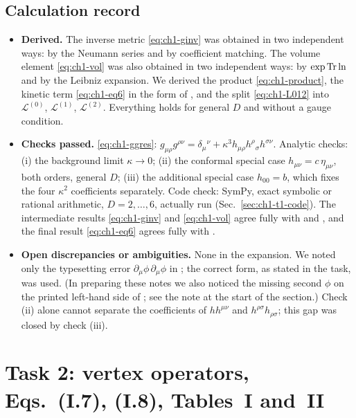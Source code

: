 \subsection{Calculation record}
\begin{itemize}[leftmargin=1.4em]
\item \textbf{Derived.} The inverse metric \eqref{eq:ch1-ginv} was obtained in
two independent ways: by the Neumann series and by coefficient matching. The
volume element \eqref{eq:ch1-vol} was also obtained in two independent ways: by
$\exp\operatorname{Tr}\ln$ and by the Leibniz expansion. We derived the product
\eqref{eq:ch1-product}, the kinetic term \eqref{eq:ch1-eq6} in the form of
, and the split \eqref{eq:ch1-L012} into $\mathcal L^{(0)}$,
$\mathcal L^{(1)}$, $\mathcal L^{(2)}$. Everything holds for general $D$ and
without a gauge condition.
\item \textbf{Checks passed.} \eqref{eq:ch1-ggres}:
$g_{\mu\rho}g^{\rho\nu}=\delta_\mu{}^\nu+\kappa^3h_{\mu\rho}h^\rho{}_\sigma h^{\sigma\nu}$.
Analytic checks: (i) the background limit $\kappa\to0$; (ii) the conformal
special case $h_{\mu\nu}=c\,\eta_{\mu\nu}$, both orders, general $D$; (iii) the
additional special case $h_{00}=b$, which fixes the four $\kappa^2$
coefficients separately. Code check: SymPy, exact symbolic or rational
arithmetic, $D=2,\ldots,6$, actually run (Sec.~\ref{sec:ch1-t1-code}). The
intermediate results \eqref{eq:ch1-ginv} and \eqref{eq:ch1-vol} agree fully with
 and , and the final result \eqref{eq:ch1-eq6} agrees fully with
.
\item \textbf{Open discrepancies or ambiguities.} None in the expansion. We
noted only the typesetting error $\partial_\mu\phi\,\partial_\mu\phi$ in
; the correct form, as stated in the task, was used. (In preparing these
notes we also noticed the missing second $\phi$ on the printed left-hand side of
; see the note at the start of the section.) Check (ii) alone cannot
separate the coefficients of $hh^{\mu\nu}$ and $h^{\rho\sigma}h_{\rho\sigma}$;
this gap was closed by check (iii).
\end{itemize}

\section{Task 2: vertex operators, Eqs.~(I.7), (I.8), Tables~I and~II}
\label{sec:ch1-task2}

